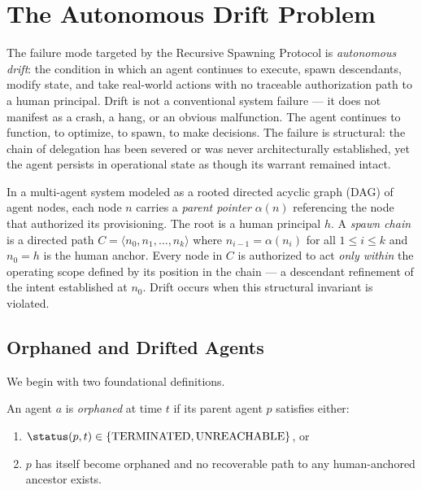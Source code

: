\section{The Autonomous Drift Problem}
\label{sec:rs-drift}

The failure mode targeted by the Recursive Spawning Protocol is \emph{autonomous drift}: the condition in which an agent continues to execute, spawn descendants, modify state, and take real-world actions with no traceable authorization path to a human principal. Drift is not a conventional system failure — it does not manifest as a crash, a hang, or an obvious malfunction. The agent continues to function, to optimize, to spawn, to make decisions. The failure is structural: the chain of delegation has been severed or was never architecturally established, yet the agent persists in operational state as though its warrant remained intact.

In a multi-agent system modeled as a rooted directed acyclic graph (DAG) of agent nodes, each node $n$ carries a \emph{parent pointer} $\alpha(n)$ referencing the node that authorized its provisioning. The root is a human principal $h$. A \emph{spawn chain} is a directed path $C = \langle n_0, n_1, \ldots, n_k \rangle$ where $n_{i-1} = \alpha(n_i)$ for all $1 \leq i \leq k$ and $n_0 = h$ is the human anchor. Every node in $C$ is authorized to act \emph{only within} the operating scope defined by its position in the chain — a descendant refinement of the intent established at $n_0$. Drift occurs when this structural invariant is violated.

\subsection{Orphaned and Drifted Agents}
\label{sec:rs-orphaned-drifted}

We begin with two foundational definitions.

\begin{definition}
An agent $a$ is \emph{orphaned} at time $t$ if its parent agent $p$ satisfies either:
\begin{enumerate}
    \item $\status(p, t) \in \{\text{TERMINATED}, \text{UNREACHABLE}\}$, or
    \item $p$ has itself become orphaned and no recoverable path to any human-anchored ancestor exists.
\end{enumerate}
\end{definition}

